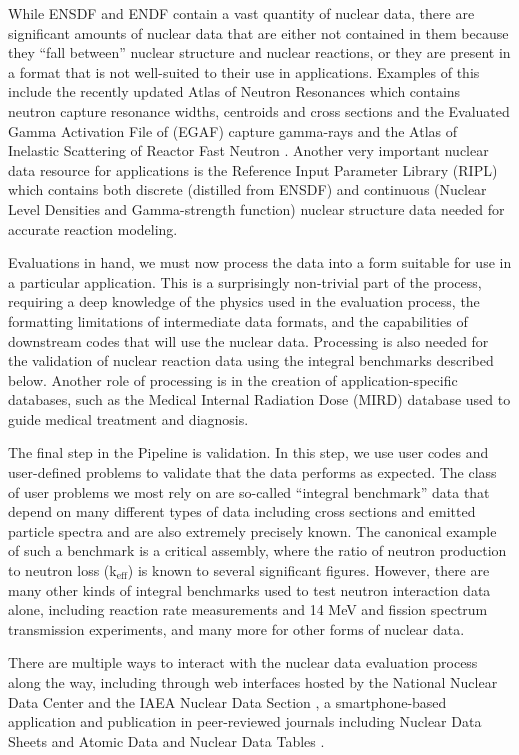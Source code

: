 \documentclass[letterpaper]{ar-1col}
\newcommand{\keff}{k$_{\textrm{eff}}$}
\begin{document}
While ENSDF and ENDF contain a vast quantity of nuclear data, there are significant amounts of nuclear data that are either not contained in them because they \enquote{fall between} nuclear structure and nuclear reactions, or they are present in a format that is not well-suited to their use in applications.
 Examples of this include the recently updated Atlas of Neutron Resonances \cite{Mug18} which contains neutron capture resonance widths, centroids and cross sections and the Evaluated Gamma Activation File of (EGAF) capture gamma-rays \cite{Fir15} and the Atlas of Inelastic Scattering of Reactor Fast Neutron \cite{Hur18}.
 Another very important nuclear data resource for applications is the Reference Input Parameter Library (RIPL) \cite{Capote2009} which contains both discrete (distilled from ENSDF) and continuous (Nuclear Level Densities and Gamma-strength function) nuclear structure data needed for accurate reaction modeling.
 

Evaluations in hand, we must now process the data into a form suitable for use in a particular application.
 This is a surprisingly non-trivial part of the process, requiring a deep knowledge of the physics used in the evaluation process, the formatting limitations of intermediate data formats, and the capabilities of downstream codes that will use the nuclear data.
 Processing is also needed for the validation of nuclear reaction data using the integral benchmarks described below.
 Another role of processing is in the creation of application-specific databases, such as the Medical Internal Radiation Dose (MIRD) \cite{MIRD} database used to guide medical treatment and diagnosis.
 

The final step in the Pipeline is validation.
 In this step, we use user codes and user-defined problems to validate that the data performs as expected.
 The class of user problems we most rely on are so-called \enquote{integral benchmark} data that depend on many different types of data including cross sections and emitted particle spectra and are also extremely precisely known.
 The canonical example of such a benchmark is a critical assembly, where the ratio of neutron production to neutron loss (\keff) is known to several significant figures.
 However, there are many other kinds of integral benchmarks used to test neutron interaction data alone, including reaction rate measurements and 14 MeV and fission spectrum transmission experiments, and many more for other forms of nuclear data.

There are multiple ways to interact with the nuclear data evaluation process along the way, including through web interfaces hosted by the National Nuclear Data Center \cite{NNDC} and the IAEA Nuclear Data Section \cite{IAEA-NDS}, a smartphone-based application \cite{IAEA-APP} and publication in peer-reviewed journals including Nuclear Data Sheets \cite{NDS} and Atomic Data and Nuclear Data Tables \cite{ATNDT}.
 
\end{document}
